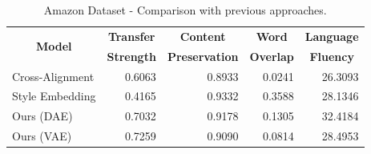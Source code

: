 \documentclass[11pt,a4paper]{article}
\newcommand{\tabh}[1]{\multicolumn{1}{c|}{\textbf{#1}}}  %
\newcommand{\tabc}[2]{\multicolumn{1}{|c|}{\multirow{#1}{*}{\textbf{#2}}}} %
\begin{document}
\begin{table}[ht]
	\centering
	\begin{tabular}{| l | r | r | r | r |}
		\hline
		\tabc{2}{Model}                       & \tabh{Transfer} & \tabh{Content}      & \tabh{Word}    & \tabh{Language} \\
		                                      & \tabh{Strength} & \tabh{Preservation} & \tabh{Overlap} & \tabh{Fluency}  \\
		\hline
		\hline
		Cross-Alignment \citep{shen2017style} & 0.6063          & 0.8933              & 0.0241         & 26.3093         \\
		\hline
		Style Embedding \citep{fu2017style}   & 0.4165          & 0.9332              & 0.3588         & 28.1346         \\
		\hline
		Ours (DAE)                            & 0.7032          & 0.9178              & 0.1305         & 32.4184         \\
		\hline
		Ours (VAE)                            & 0.7259          & 0.9090              & 0.0814         & 28.4953         \\
		\hline
	\end{tabular}
	\caption{Amazon Dataset - Comparison with previous approaches.}
	\label{tab:amazon-comparison-previous}
\end{table}
\end{document}
